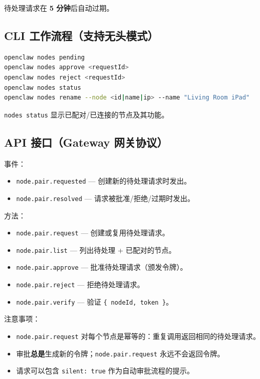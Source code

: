 待处理请求在 \textbf{5 分钟}后自动过期。

\subsection{CLI 工作流程（支持无头模式）}


\begin{lstlisting}[language=bash]
openclaw nodes pending
openclaw nodes approve <requestId>
openclaw nodes reject <requestId>
openclaw nodes status
openclaw nodes rename --node <id|name|ip> --name "Living Room iPad"
\end{lstlisting}


\texttt{nodes status} 显示已配对/已连接的节点及其功能。

\subsection{API 接口（Gateway 网关协议）}


事件：

\begin{itemize}
  \item \texttt{node.pair.requested} — 创建新的待处理请求时发出。
  \item \texttt{node.pair.resolved} — 请求被批准/拒绝/过期时发出。
\end{itemize}


方法：

\begin{itemize}
  \item \texttt{node.pair.request} — 创建或复用待处理请求。
  \item \texttt{node.pair.list} — 列出待处理 + 已配对的节点。
  \item \texttt{node.pair.approve} — 批准待处理请求（颁发令牌）。
  \item \texttt{node.pair.reject} — 拒绝待处理请求。
  \item \texttt{node.pair.verify} — 验证 \texttt{\{ nodeId, token \}}。
\end{itemize}


注意事项：

\begin{itemize}
  \item \texttt{node.pair.request} 对每个节点是幂等的：重复调用返回相同的待处理请求。
  \item 审批\textbf{总是}生成新的令牌；\texttt{node.pair.request} 永远不会返回令牌。
  \item 请求可以包含 \texttt{silent: true} 作为自动审批流程的提示。
\end{itemize}


